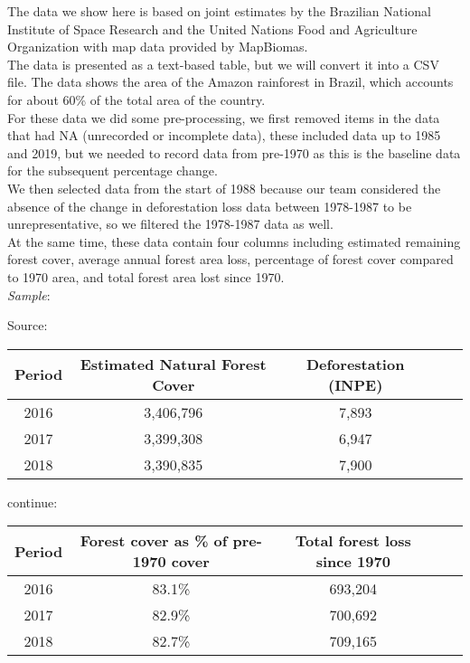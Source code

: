 \documentclass[12pt]{article}
\begin{document}
\begin{enumerate}
\begin{text}
The data we show here is based on joint estimates by the Brazilian National Institute of Space Research and the United Nations Food and Agriculture Organization with map data provided by MapBiomas.\\
    The data is presented as a text-based table, but we will convert it into a CSV file. The data shows the area of the Amazon rainforest in Brazil, which accounts for about 60\% of the total area of the country.\\
    For these data we did some pre-processing, we first removed items in the data that had NA (unrecorded or incomplete data), these included data up to 1985 and 2019, but we needed to record data from pre-1970 as this is the baseline data for the subsequent percentage change.\\
    We then selected data from the start of 1988 because our team considered the absence of the change in deforestation loss data between 1978-1987 to be unrepresentative, so we filtered the 1978-1987 data as well.\\
    At the same time, these data contain four columns including estimated remaining forest cover, average annual forest area loss, percentage of forest cover compared to 1970 area, and total forest area lost since 1970.\\


    \emph{Sample}:

    Source: \citep{But20}



    \begin{tabular}{ |c|c|c|c|c| }
    \hline
    Period &	Estimated Natural Forest Cover &	Deforestation (INPE) \\
      \hline
      2016 & 3,406,796  & 7,893 \\
      \hline
      2017 & 3,399,308  & 6,947  \\
      \hline
      2018 & 3,390,835  & 7,900   \\
      \hline
    \end{tabular}

    continue:

    \begin{tabular}{ |c|c|c|c|c| }
    \hline
    Period & Forest cover as \% of pre-1970 cover & Total forest loss since 1970  \\
      \hline
      2016 &  	83.1\% & 	693,204  \\
      \hline
      2017 & 82.9\% &	700,692  \\
      \hline
      2018 &  82.7\% &	709,165  \\
      \hline
    \end{tabular}
\end{text}
\newpage


\end{enumerate}
\end{document}
